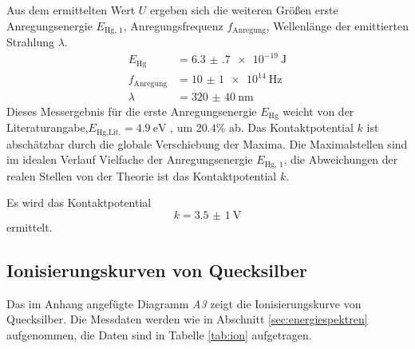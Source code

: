 Aus dem ermittelten Wert $U$ ergeben sich die weiteren Größen erste Anregungsenergie $E_\text{Hg, 1}$, Anregungsfrequenz $f_\text{Anregung}$, Wellenlänge der emittierten Strahlung $\lambda$.
\begin{align}	
	E_\text{Hg}		&=\SI{6.3(7)e-19}{\joule}\\
	f_\text{Anregung}	&=\SI{10(1)e+14}{\hertz}\\
	\lambda				&=\SI{320(40)}{\nano\meter}
\end{align}
Dieses Messergebnis für die erste Anregungsenergie $E_\text{Hg}$ weicht von der Literaturangabe,$E_\text{Hg,Lit.}=\SI{4.9}{\electronvolt}$ \cite{IonEx}, um $20.4\%$ ab.
Das Kontaktpotential $k$ ist abschätzbar durch die globale Verschiebung der Maxima.
Die Maximalstellen sind im idealen Verlauf Vielfache der Anregungsenergie $E_\text{Hg, 1}$, 
die Abweichungen der realen Stellen von der Theorie ist das Kontaktpotential $k$.

Es wird das Kontaktpotential
\begin{equation}
	k=\SI{3.5(10)}{\volt}
	\label{qu:k2}
\end{equation}
ermittelt.


\subsection{Ionisierungskurven von Quecksilber} %
\label{sec:ion}
Das im Anhang angefügte Diagramm \emph{A3} zeigt die Ionisierungskurve von Quecksilber.
Die Messdaten werden wie in Abschnitt \ref{sec:energiespektren} aufgenommen, 
die Daten sind in Tabelle \ref{tab:ion} aufgetragen.

